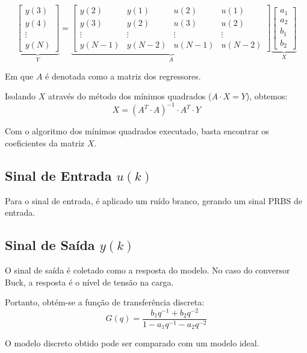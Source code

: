 \documentclass[twocolumn,10pt]{article}
\begin{document}
\begin{equation}
\underbrace{
\begin{bmatrix} 
y(3) \\ 
y(4) \\ 
\vdots \\ 
y(N) 
\end{bmatrix}
}_{Y}
=
\underbrace{
\begin{bmatrix} 
y(2) & y(1) & u(2) & u(1) \\
y(3) & y(2) & u(3) & u(2) \\
\vdots & \vdots & \vdots & \vdots \\
y(N-1) & y(N-2) & u(N-1) & u(N-2)
\end{bmatrix}
}_{A}
\underbrace{
\begin{bmatrix} 
a_1 \\ 
a_2 \\ 
b_1 \\ 
b_2 
\end{bmatrix}
}_{X}
\end{equation}

Em que $A$ é denotada como a matriz dos regressores.

Isolando $X$ através do método dos mínimos quadrados ($A \cdot X = Y$), obtemos:
\begin{equation}
X = (A^T \cdot A)^{-1} \cdot A^T \cdot Y
\end{equation}

Com o algoritmo dos mínimos quadrados executado, basta encontrar os coeficientes da matriz $X$.

\subsection{Sinal de Entrada $u(k)$}
Para o sinal de entrada, é aplicado um ruído branco, gerando um sinal PRBS de entrada.

\subsection{Sinal de Saída $y(k)$}
O sinal de saída é coletado como a resposta do modelo. No caso do conversor Buck, a resposta é o nível de tensão na carga.

Portanto, obtém-se a função de transferência discreta:
\begin{equation}
G(q) = \frac{b_1 q^{-1} + b_2 q^{-2}}{1 - a_1 q^{-1} - a_2 q^{-2}}
\end{equation}

O modelo discreto obtido pode ser comparado com um modelo ideal.
\end{document}
